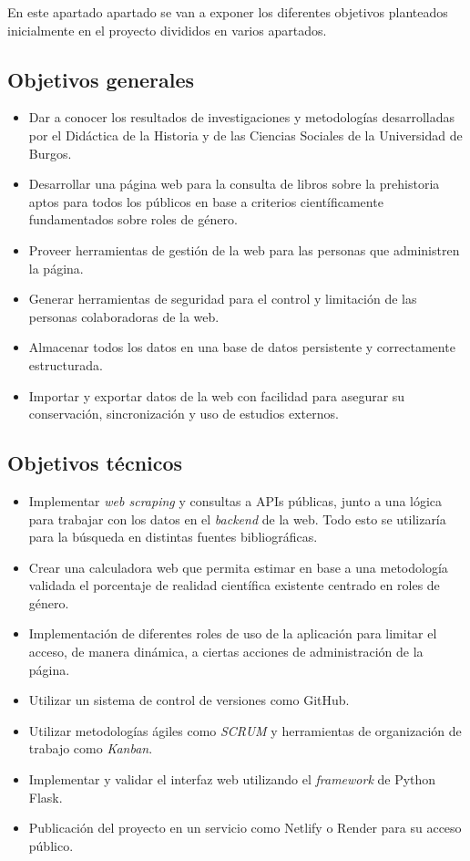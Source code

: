 En este apartado apartado se van a exponer los diferentes objetivos planteados inicialmente en el proyecto divididos en varios apartados.
\subsection{Objetivos generales}
\begin{itemize}
    \item Dar a conocer los resultados de investigaciones y metodologías desarrolladas por el Didáctica de la Historia y de las Ciencias Sociales de la Universidad de Burgos.
    \item Desarrollar una página web para la consulta de libros sobre la prehistoria aptos para todos los públicos en base a criterios científicamente fundamentados sobre roles de género.
    \item Proveer herramientas de gestión de la web para las personas que administren la página.
    \item Generar herramientas de seguridad para el control y limitación de las personas colaboradoras de la web.
    \item Almacenar todos los datos en una base de datos persistente y correctamente estructurada.
    \item Importar y exportar datos de la web con facilidad para asegurar su conservación, sincronización y uso de estudios externos.

\end{itemize}

\subsection{Objetivos técnicos}
\begin{itemize}
    \item Implementar \textit{web scraping} y consultas a APIs públicas, junto a una lógica para trabajar con los datos en el \textit{backend} de la web. Todo esto se utilizaría para la búsqueda en distintas fuentes bibliográficas.
    \item Crear una calculadora web que permita estimar en base a una metodología validada el porcentaje de realidad científica existente centrado en roles de género.
    \item Implementación de diferentes roles de uso de la aplicación para limitar el acceso, de manera dinámica, a ciertas acciones de administración de la página.
    \item Utilizar un sistema de control de versiones como GitHub.
    \item Utilizar metodologías ágiles como \textit{SCRUM} y herramientas de organización de trabajo como \textit{Kanban}.
    \item Implementar y validar el interfaz web utilizando el \textit{framework} de Python Flask.
    \item Publicación del proyecto en un servicio como Netlify o Render para su acceso público.

\end{itemize}

